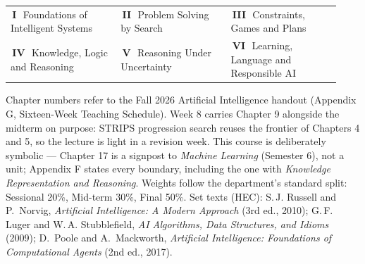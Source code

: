 \documentclass[10pt,a4paper]{article}
\makeatletter
\newcommand{\chipw}[2]{{\setlength{\fboxsep}{1.3pt}\colorbox{#1}{%
  \fontsize{6.4}{7}\selectfont\bfseries\color{white}\,#2\,}}}
\newcommand{\legend}[6]{{\fontsize{6.6}{8}\selectfont\color{sub}%
  \begin{tabular}{@{}p{0.31\linewidth}p{0.31\linewidth}p{0.31\linewidth}@{}}
  \chipw{p1}{I}\ #1 & \chipw{p2}{II}\ #2 & \chipw{p3}{III}\ #3 \\[1pt]
  \chipw{p4}{IV}\ #4 & \chipw{p5}{V}\ #5 & \chipw{p6}{VI}\ #6
  \end{tabular}}}
\makeatother
\begin{document}
\vspace{4pt}
\legend{Foundations of Intelligent Systems}{Problem Solving by Search}{Constraints, Games and Plans}
       {Knowledge, Logic and Reasoning}{Reasoning Under Uncertainty}{Learning, Language and Responsible AI}

\vspace{2pt}
{\fontsize{6.3}{7.6}\selectfont\color{neutral}%
Chapter numbers refer to the Fall 2026 Artificial Intelligence handout (Appendix G, Sixteen-Week Teaching Schedule). Week 8 carries Chapter 9 alongside the midterm on purpose: STRIPS progression search reuses the frontier of Chapters 4 and 5, so the lecture is light in a revision week.
This course is deliberately symbolic --- Chapter 17 is a signpost to \emph{Machine Learning} (Semester 6), not a unit; Appendix F states every boundary, including the one with \emph{Knowledge Representation and Reasoning}.
Weights follow the department's standard split: Sessional 20\%, Mid-term 30\%, Final 50\%. Set texts (HEC): S.\,J. Russell and P.\ Norvig, \emph{Artificial Intelligence: A Modern Approach} (3rd ed., 2010); G.\,F. Luger and W.\,A. Stubblefield, \emph{AI Algorithms, Data Structures, and Idioms} (2009); D.\ Poole and A.\ Mackworth, \emph{Artificial Intelligence: Foundations of Computational Agents} (2nd ed., 2017).\par}
\end{document}
